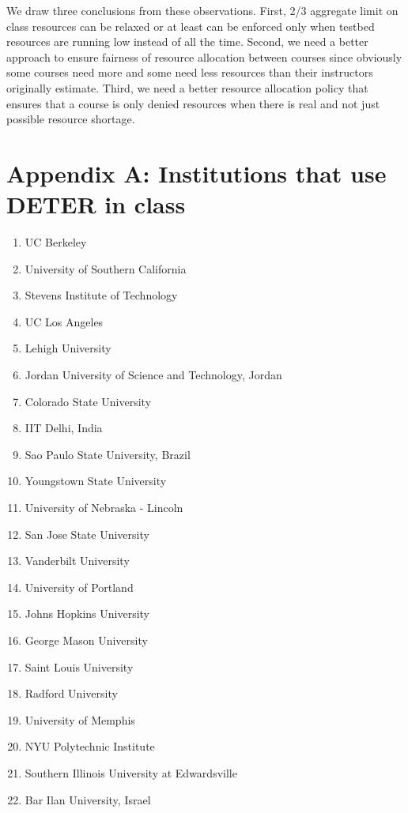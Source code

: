 \documentclass[12pt]{article}
\begin{document}
We draw three conclusions from these observations. First, 2/3 aggregate
limit on class resources can be relaxed or at least can be enforced only
when testbed resources are running low instead of all the time. Second,
we need a better approach to ensure fairness of resource allocation
between courses since obviously some courses need more and some need
less resources than their instructors originally estimate. Third, we
need a better resource allocation policy that ensures that a course is
only denied resources when there is real and not just possible resource
shortage.


\section{Appendix A: Institutions that use DETER in class}

\begin{enumerate}
\item UC Berkeley
\item University of Southern California
\item Stevens Institute of Technology
\item UC Los Angeles
\item Lehigh University
\item Jordan University of Science and Technology, Jordan
\item Colorado State University
\item IIT Delhi, India
\item Sao Paulo State University, Brazil
\item Youngstown State University
\item University of Nebraska - Lincoln
\item San Jose State University
\item Vanderbilt University
\item University of Portland
\item Johns Hopkins University
\item George Mason University
\item Saint Louis University
\item Radford University
\item University of Memphis
\item NYU Polytechnic Institute
\item Southern Illinois University at Edwardsville
\item Bar Ilan University, Israel
\end{enumerate}

\end{document}
